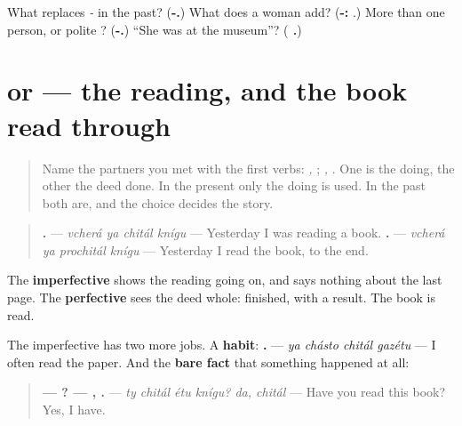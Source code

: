 \begin{tcolorbox}[breakable,colback=teal!4,colframe=teal!35!black,title={Before you move on}]
What replaces \emph{-} in the past? (\textbf{-.}) What does a woman add? (\textbf{-:} \emph{\textbf{}}.) More than one person, or polite \emph{}? (\textbf{-.}) \textquotedblleft{}She was at the museum\textquotedblright{}? (\emph{\textbf{   .}})
\end{tcolorbox}
\section[\texorpdfstring{\ru{читал} / \ru{прочитал} (chitál / prochitál)}{читал / прочитал (chitál / prochitál)}]{ or  — the reading, and the book read through}

\label{lesson:RU-C261-prochital}



\begin{quote}
Name the partners you met with the first verbs: \emph{, }; \emph{, }. One is the doing, the other the deed done. In the present only the doing is used. In the past both are, and the choice decides the story.
\end{quote}

\begin{grammarlens}[title={Grammar Lens: the doing, or the deed done}]
\begin{quote}
\textbf{   .} — \emph{vcherá ya chitál knígu} — Yesterday I was reading a book. \textbf{   .} — \emph{vcherá ya prochitál knígu} — Yesterday I read the book, to the end.
\end{quote}

The \textbf{imperfective} shows the reading going on, and says nothing about the last page. The \textbf{perfective} sees the deed whole: finished, with a result. The book is read.
\end{grammarlens}

\begin{grammarlens}[title={Grammar Lens: a habit, and a bare fact}]
The imperfective has two more jobs. A \textbf{habit}: \textbf{   .} — \emph{ya chásto chitál gazétu} — I often read the paper. And the \textbf{bare fact} that something happened at all:

\begin{quote}
\textbf{—    ? — , .} — \emph{ty chitál étu knígu? da, chitál} — Have you read this book? Yes, I have.
\end{quote}
\end{grammarlens}

